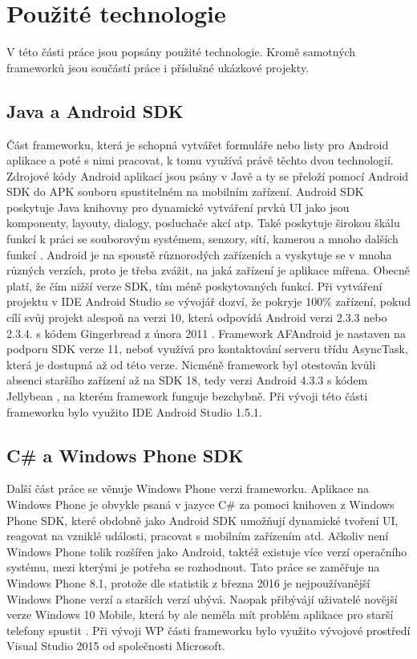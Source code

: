 \section{Použité technologie}
V této části práce jsou popsány použité technologie. Kromě samotných frameworků jsou součástí práce i příslušné ukázkové projekty.

\subsection{Java a Android SDK}
Část frameworku, která je schopná vytvářet formuláře nebo listy pro Android aplikace a poté s nimi pracovat, k tomu využívá právě těchto dvou technologií. Zdrojové kódy Android aplikací jsou psány v Javě a ty se přeloží pomocí Android SDK do APK souboru spustitelném na mobilním zařízení. Android SDK poskytuje Java knihovny pro dynamické vytváření prvků UI jako jsou komponenty, layouty, dialogy, posluchače akcí atp. Také poskytuje širokou škálu funkcí k práci se souborovým systémem, senzory, sítí, kamerou a mnoho dalších funkcí \cite{android-intro}. Android je na spoustě různorodých zařízeních a vyskytuje se v mnoha různých verzích, proto je třeba zvážit, na jaká zařízení je aplikace mířena. Obecně platí, že čím nižší verze SDK, tím méně poskytovaných funkcí. Při vytváření projektu v IDE Android Studio se vývojář dozví, že pokryje 100\% zařízení, pokud cílí svůj projekt alespoň na verzi 10, která odpovídá Android verzi 2.3.3 nebo 2.3.4. s kódem Gingerbread z února 2011 \cite{android-sdks}. Framework AFAndroid je nastaven na podporu SDK verze 11, neboť využívá pro kontaktování serveru třídu AsyncTask, která je dostupná až od této verze. Nicméně framework byl otestován kvůli absenci staršího zařízení až na SDK 18, tedy verzi Android 4.3.3 s kódem Jellybean \cite{android-sdks}, na kterém framework funguje bezchybně. Při vývoji této části frameworku bylo využito IDE Android Studio 1.5.1.

\subsection{C\# a Windows Phone SDK}
Další část práce se věnuje Windows Phone verzi frameworku. Aplikace na Windows Phone je obvykle psaná v jazyce C\# \cite{wp-csharp} za pomoci knihoven z Windows Phone SDK, které obdobně jako Android SDK umožňují dynamické tvoření UI, reagovat na vzniklé události, pracovat s mobilním zařízením atd. Ačkoliv není Windows Phone tolik rozšířen jako Android, taktéž existuje více verzí operačního systému, mezi kterými je potřeba se rozhodnout. Tato práce se zaměřuje na Windows Phone 8.1, protože dle statistik z března 2016 je nejpoužívanější Windows Phone verzí a starších verzí ubývá. Naopak přibývájí uživatelé novější verze Windows 10 Mobile, která by ale neměla mít problém aplikace pro starší telefony spustit \cite{wp-statistics}. Při vývoji WP části frameworku bylo využito vývojové prostředí Visual Studio 2015 od společnosti Microsoft.

